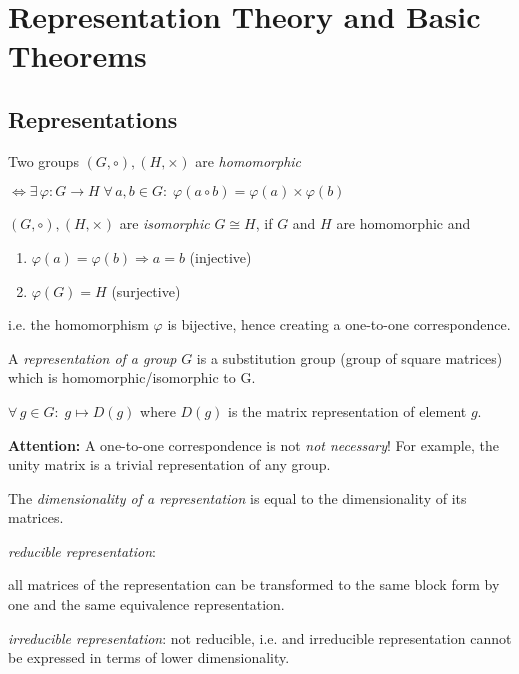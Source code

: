 \newpage
\section{Representation Theory and Basic Theorems}
\subsection{Representations}

\begin{dfn}\label{dfn:21_homo-iso}
Two groups $(G, \circ), (H, \times)$ are \textit{homomorphic} \par
$\Leftrightarrow \exists \, \varphi: G \rightarrow H \; \forall \, a,b \in G: \; \varphi(a\circ b) = \varphi(a) \times \varphi(b)$ \par 
\noindent  $(G, \circ), (H, \times)$ are \textit{isomorphic} $G \cong H$, if $G$ and $H$ are homomorphic and
\begin{enumerate}
	\item $\varphi(a) = \varphi(b) \Rightarrow a=b$ (injective)
	\item $\varphi(G) = H$ (surjective)
\end{enumerate}
\noindent i.e. the homomorphism $\varphi$ is bijective, hence creating a one-to-one correspondence. 
\end{dfn}

\begin{dfn}\label{dfn:22_repr-group}
A \textit{representation of a group} $G$ is a substitution group (group of square matrices) which is homomorphic/isomorphic to G. \par
$\forall \, g \in G: \; g \mapsto D(g)$ where $D(g)$ is the matrix representation of element $g$. 
\end{dfn}

\textbf{Attention:} A one-to-one correspondence is not \textit{not necessary}! For example, the unity matrix is a trivial representation of any group. 

\begin{dfn}\label{dfn:23_dim-repr}
The \textit{dimensionality of a representation} is equal to the dimensionality of its matrices. 
\end{dfn}

\begin{dfn}\label{dfn:23_irred-repr}
\noindent \textit{reducible representation}: \par
all matrices of the representation can be transformed to the same block form by one and the same equivalence representation. \par 
\noindent \textit{irreducible representation}:
not reducible, i.e. and irreducible representation cannot be expressed in terms of lower dimensionality. 
\end{dfn}

